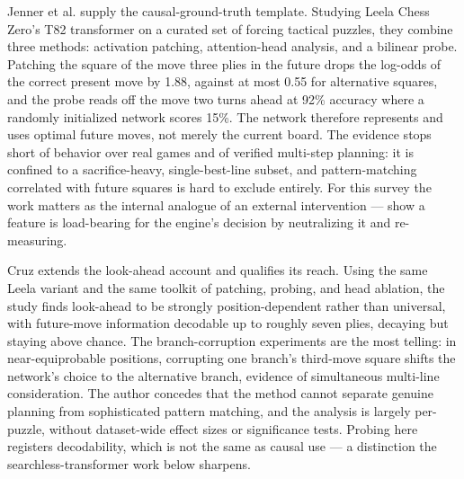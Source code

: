 \documentclass[conference]{IEEEtran}
\begin{document}
Jenner et al. \cite{ref4} supply the causal-ground-truth template. Studying Leela Chess Zero's T82 transformer on a curated set of forcing tactical puzzles, they combine three methods: activation patching, attention-head analysis, and a bilinear probe. Patching the square of the move three plies in the future drops the log-odds of the correct present move by 1.88, against at most 0.55 for alternative squares, and the probe reads off the move two turns ahead at 92\% accuracy where a randomly initialized network scores 15\%. The network therefore represents and uses optimal future moves, not merely the current board. The evidence stops short of behavior over real games and of verified multi-step planning: it is confined to a sacrifice-heavy, single-best-line subset, and pattern-matching correlated with future squares is hard to exclude entirely. For this survey the work matters as the internal analogue of an external intervention --- show a feature is load-bearing for the engine's decision by neutralizing it and re-measuring.

Cruz \cite{ref23} extends the look-ahead account and qualifies its reach. Using the same Leela variant and the same toolkit of patching, probing, and head ablation, the study finds look-ahead to be strongly position-dependent rather than universal, with future-move information decodable up to roughly seven plies, decaying but staying above chance. The branch-corruption experiments are the most telling: in near-equiprobable positions, corrupting one branch's third-move square shifts the network's choice to the alternative branch, evidence of simultaneous multi-line consideration. The author concedes that the method cannot separate genuine planning from sophisticated pattern matching, and the analysis is largely per-puzzle, without dataset-wide effect sizes or significance tests. Probing here registers decodability, which is not the same as causal use --- a distinction the searchless-transformer work below sharpens.
\end{document}
